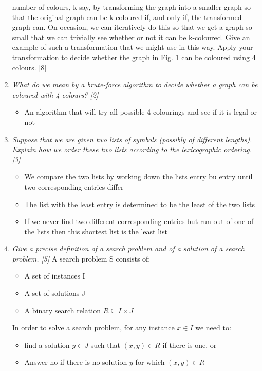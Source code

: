 \documentclass{article}[18pt]
\begin{document}
\begin{enumerate}
{		number of colours, k say, by transforming the graph into a smaller
		graph so that the original graph can be k-coloured if, and only if, the
		transformed graph can. On occasion, we can iteratively do this so that
		we get a graph so small that we can trivially see whether or not it
		can be k-coloured. Give an example of such a transformation that we
		might use in this way. Apply your transformation to decide whether
		the graph in Fig. 1 can be coloured using 4 colours. [8]}
	\item \textit{What do we mean by a brute-force algorithm to decide whether a graph
		can be coloured with 4 colours? [2]}
	\begin{itemize}
		\item An algorithm that will try all possible 4 colourings and see if it is legal or not
	\end{itemize}
	\item \textit{Suppose that we are given two lists of symbols (possibly of different
		lengths). Explain how we order these two lists according to the lexicographic
		ordering. [3]}
	\begin{itemize}
		\item We compare the two lists by working down the lists entry bu entry until two corresponding entries differ
		\item The list with the least entry is determined to be the least of the two lists
		\item If we never find two different corresponding entries but run out of one of the lists then this shortest list is the least list
	\end{itemize}
	\item \textit{Give a precise definition of a search problem and of a solution of a
		search problem. [5]}
	A search problem S consists of:
	\begin{itemize}
		\item A set of instances I
		\item A set of solutions J
		\item A binary search relation $R\subseteq I\times J$
	\end{itemize}
	In order to solve a search problem, for any instance $x\in I$ we need to:
	\begin{itemize}
		\item find a solution $y\in J$ such that $(x,y)\in R$ if there is one, or
		\item Answer no if there is no solution $y$ for which $(x,y)\in R$
	\end{itemize}

\end{enumerate}
\end{document}
